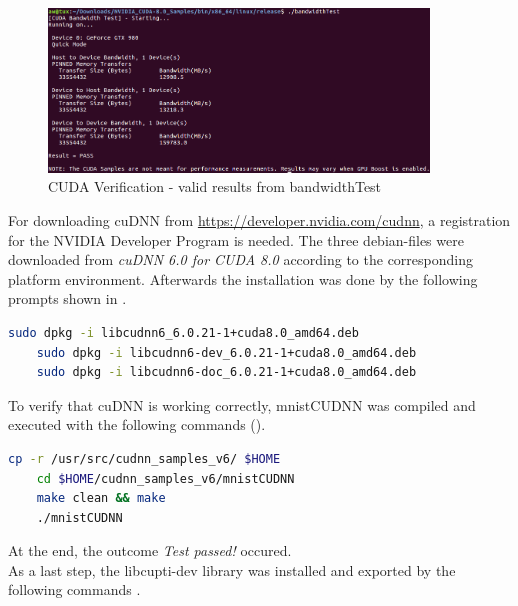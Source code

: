 \begin{figure}[htbp]
\centering
\includegraphics[width=0.9\textwidth]{includes/GPUBandwidth}
\caption[CUDA Verification - valid results from bandwidthTest]{CUDA Verification - valid results from bandwidthTest}
\label{fig:GPUBandwidth}
\end{figure}

For downloading cuDNN from \url{https://developer.nvidia.com/cudnn}, a registration for the NVIDIA Developer Program is needed. The three debian-files were downloaded from \textit{cuDNN 6.0 for CUDA 8.0} according to the corresponding platform environment. Afterwards the installation was done by the following prompts shown in .

\begin{minipage}{\linewidth}
\begin{lstlisting}[caption=Installation of cuDNN, label=list:cuDNN, language=bash]
	sudo dpkg -i libcudnn6_6.0.21-1+cuda8.0_amd64.deb
	sudo dpkg -i libcudnn6-dev_6.0.21-1+cuda8.0_amd64.deb
	sudo dpkg -i libcudnn6-doc_6.0.21-1+cuda8.0_amd64.deb
\end{lstlisting}
\end{minipage}

To verify that cuDNN is working correctly, mnistCUDNN was compiled and executed  with the following commands ().

\begin{minipage}{\linewidth}
\begin{lstlisting}[caption=Verification of cuDNN, label=list:cuDNNverify, language=bash]
	cp -r /usr/src/cudnn_samples_v6/ $HOME
	cd $HOME/cudnn_samples_v6/mnistCUDNN
	make clean && make
	./mnistCUDNN
\end{lstlisting}
\end{minipage}

At the end, the outcome \textit{Test passed!} occured. \\

As a last step, the libcupti-dev library was installed and exported by the following commands .

